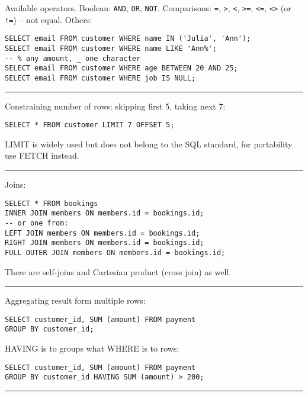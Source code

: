\documentclass{charun}
\begin{document}
\begin{multicols*}{2}
Available operators.
Boolean:
\texttt{AND},
\texttt{OR},
\texttt{NOT}.
Comparisons:
\texttt{=},
\texttt{>},
\texttt{<},
\texttt{>=},
\texttt{<=},
\texttt{<>} (or \texttt{!=}) -- not equal.
Others:
\begin{verbatim}
SELECT email FROM customer WHERE name IN ('Julia', 'Ann');
SELECT email FROM customer WHERE name LIKE 'Ann%';
-- % any amount, _ one character
SELECT email FROM customer WHERE age BETWEEN 20 AND 25;
SELECT email FROM customer WHERE job IS NULL;
\end{verbatim}

\hrule

Constraining number of rows: skipping first 5, taking next 7:
\begin{verbatim}
SELECT * FROM customer LIMIT 7 OFFSET 5;
\end{verbatim}

LIMIT is widely used but does not belong to the SQL standard, for portability use FETCH instead.

\hrule

Joins:
\begin{verbatim}
SELECT * FROM bookings
INNER JOIN members ON members.id = bookings.id;
-- or one from:
LEFT JOIN members ON members.id = bookings.id;
RIGHT JOIN members ON members.id = bookings.id;
FULL OUTER JOIN members ON members.id = bookings.id;
\end{verbatim}

There are self-joins and Cartesian product (cross join) as well.

\hrule

Aggregating result form multiple rows:
\begin{verbatim}
SELECT customer_id, SUM (amount) FROM payment
GROUP BY customer_id;
\end{verbatim}

HAVING is to groups what WHERE is to rows:
\begin{verbatim}
SELECT customer_id, SUM (amount) FROM payment
GROUP BY customer_id HAVING SUM (amount) > 200;
\end{verbatim}

\hrule

\end{multicols*}
\end{document}
